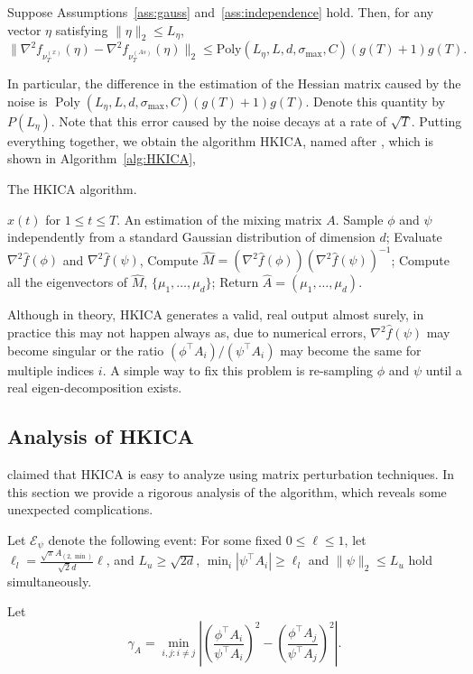 \documentclass[twoside,11pt]{article}
\newcommand{\Epsi}{\mathcal{E}_{\psi}}
\DeclareMathOperator{\pol}{Poly}
\newcommand{\poly}[1]{\pol\left(#1\right)}
\begin{document}
\begin{proposition}
 \label{prop:denoise}
 Suppose Assumptions~\ref{ass:gauss} and~\ref{ass:independence} hold. Then,
for any vector $\eta$ satisfying $\|\eta\|_2\le L_{\eta}$,
\[
\| \nabla^2f_{\nu_T^{(x)}}(\eta) - \nabla^2f_{\nu_T^{(As)}}(\eta) \|_2 \le \text{Poly}(L_{\eta}, L, d, \sigma_{\max}, C)(g(T)+1)g(T). 
\] 
\end{proposition}

In particular, the difference in the estimation of the Hessian matrix caused by the noise is $\poly{L_{\eta}, L, d, \sigma_{\max}, C}\left(g(T)+1\right)g(T)$.
Denote this quantity by $P(L_{\eta})$. 
Note that this error caused by the noise decays at a rate of $\sqrt{T}$.
Putting everything together, we obtain the algorithm HKICA, named after \citet{hsu2013learning}, which is shown in Algorithm~\ref{alg:HKICA},
\begin{algorithm}[H]
\caption{The HKICA algorithm.}
\label{alg:HKICA}
\begin{algorithmic}[1]
\INPUT $x(t)$ for $1\le t \le T$. 
\OUTPUT An estimation of the mixing matrix $A$. 
\STATE Sample $\phi$ and $\psi$ independently from a standard Gaussian distribution of dimension $d$;
\STATE Evaluate $\nabla^2\hat{f}(\phi)$ and $\nabla^2\hat{f}(\psi)$, 
\STATE Compute $\hat{M} = (\nabla^2 \hat{f}(\phi))(\nabla^2\hat{f}(\psi))^{-1}$;
\STATE Compute all the eigenvectors of $\hat{M}$, $\{\mu_1,\ldots,\mu_d\}$;
\STATE Return $\hat{A} = (\mu_1,\ldots,\mu_d)$.
\end{algorithmic}
\end{algorithm}

\begin{remark}
\label{rmk:symmetrization} 
Although in theory, HKICA generates a valid, real output almost surely, in practice this may not happen always as, due to numerical errors, $\nabla^2\hat{f}(\psi)$ may become singular or the ratio $(\phi^\top A_i)/(\psi^\top A_i)$ may become the same for multiple indices $i$. A simple way to fix this problem is re-sampling $\phi$ and $\psi$ until a real eigen-decomposition exists.
\end{remark}


\subsection{Analysis of HKICA}
\label{sec:AnalysisHK}
\citet{hsu2013learning} claimed that HKICA is easy to analyze using matrix perturbation techniques. In this section we provide a rigorous analysis of the algorithm, which reveals some unexpected complications.
\begin{definition}
Let $\Epsi$ denote the following event: For some fixed $0\le \ell\le 1$, let $\ell_l = \frac{\sqrt{\pi}A_{(2,\min)}}{\sqrt{2}d} \ell$, and $ L_u \ge \sqrt{2d}$,
$\min_i |\psi^{\top}A_i| \ge \ell_l$ and $\|\psi\|_2 \le L_u$ hold simultaneously. 
\end{definition}
Let 
\begin{equation}
\label{def:kappa}
\gamma_A =  \min_{i,j: i\neq j} \left\vert \left(\frac{\phi^{\top}A_i}{\psi^{\top}A_i}\right)^2 - \left(\frac{\phi^{\top}A_j}{\psi^{\top}A_j}\right)^2 \right\vert. 
\end{equation}
\end{document}
